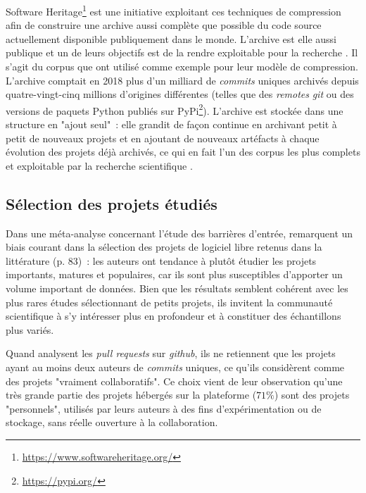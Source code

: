 \documentclass[dvipsnames]{llncs}
\newcommand{\en}[1]{\foreignlanguage{english}{\emph{#1}}}
\begin{document}
    Software Heritage\footnote{\url{https://www.softwareheritage.org/}} est une initiative exploitant ces
    techniques de compression afin de construire une archive aussi complète que possible du code source
    actuellement disponible publiquement dans le monde. L'archive est elle aussi publique et un de leurs
    objectifs est de la rendre exploitable pour la recherche \parencite{swh-2017}. Il s'agit du corpus que
    \textcite{swh-graph-2020} ont utilisé comme exemple pour leur modèle de compression. L'archive comptait en
    2018 plus d'un milliard de \en{commits} uniques archivés depuis quatre-vingt-cinq millions d'origines
    différentes (telles que des \en{remotes} \en{git} ou des versions de paquets Python publiés sur
    PyPi\footnote{\url{https://pypi.org/}}). L'archive est stockée dans une structure en "ajout seul" : elle
    grandit de façon continue en archivant petit à petit de nouveaux projets et en ajoutant de nouveaux
    artéfacts à chaque évolution des projets déjà archivés, ce qui en fait l'un des corpus les plus complets
    et exploitable par la recherche scientifique \parencite{swh-2019,swh-growth-2019}.

    \subsection{Sélection des projets étudiés}

    Dans une méta-analyse concernant l'étude des barrières d'entrée, \textcite{barriers-meta-2015} remarquent
    un biais courant dans la sélection des projets de logiciel libre retenus dans la littérature (p. 83) : les
    auteurs ont tendance à plutôt étudier les projets importants, matures et populaires, car ils sont plus
    susceptibles d'apporter un volume important de données. Bien que les résultats semblent cohérent avec les
    plus rares études sélectionnant de petits projets, ils invitent la communauté scientifique à s'y
    intéresser plus en profondeur et à constituer des échantillons plus variés.

    Quand \textcite{mining-github-2014} analysent les \en{pull requests} sur \en{github}, ils ne retiennent
    que les projets ayant au moins deux auteurs de \en{commits} uniques, ce qu'ils considèrent comme des
    projets "vraiment collaboratifs". Ce choix vient de leur observation qu'une très grande partie des projets
    hébergés sur la plateforme ($71\%$) sont des projets "personnels", utilisés par leurs auteurs à des fins
    d'expérimentation ou de stockage, sans réelle ouverture à la collaboration.
\end{document}
